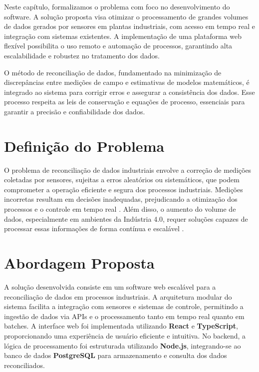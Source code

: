\label{Cap:Problema}

Neste capítulo, formalizamos o problema com foco no desenvolvimento do software. A solução proposta visa otimizar o processamento de grandes volumes de dados gerados por sensores em plantas industriais, com acesso em tempo real e integração com sistemas existentes. A implementação de uma plataforma web flexível possibilita o uso remoto e automação de processos, garantindo alta escalabilidade e robustez no tratamento dos dados.

O método de reconciliação de dados, fundamentado na minimização de discrepâncias entre medições de campo e estimativas de modelos matemáticos, é integrado ao sistema para corrigir erros e assegurar a consistência dos dados. Esse processo respeita as leis de conservação e equações de processo, essenciais para garantir a precisão e confiabilidade dos dados.

\section{Definição do Problema}
\label{Sec:DefinicaoProblema}

O problema de reconciliação de dados industriais envolve a correção de medições coletadas por sensores, sujeitas a erros aleatórios ou sistemáticos, que podem comprometer a operação eficiente e segura dos processos industriais. Medições incorretas resultam em decisões inadequadas, prejudicando a otimização dos processos e o controle em tempo real \cite{datareconciliationdefinition}. Além disso, o aumento do volume de dados, especialmente em ambientes da Indústria 4.0, requer soluções capazes de processar essas informações de forma contínua e escalável \cite{industry40}.

\section{Abordagem Proposta}
\label{Sec:AbordagemProposta}

A solução desenvolvida consiste em um software web escalável para a reconciliação de dados em processos industriais. A arquitetura modular do sistema facilita a integração com sensores e sistemas de controle, permitindo a ingestão de dados via APIs e o processamento tanto em tempo real quanto em batches. A interface web foi implementada utilizando \textbf{React} e \textbf{TypeScript}, proporcionando uma experiência de usuário eficiente e intuitiva. No backend, a lógica de processamento foi estruturada utilizando \textbf{Node.js}, integrando-se ao banco de dados \textbf{PostgreSQL} para armazenamento e consulta dos dados reconciliados.

